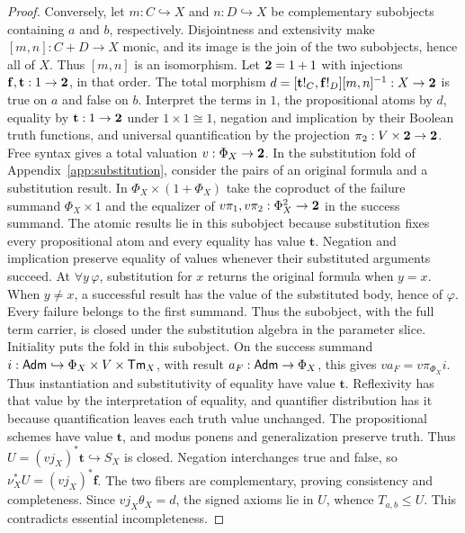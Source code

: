 \begin{proof}
Conversely, let $m:C\hookrightarrow X$ and $n:D\hookrightarrow X$
be complementary subobjects containing $a$ and $b$, respectively.
Disjointness and extensivity make $[m,n]:C+D\to X$ monic, and
its image is the join of the two subobjects, hence all of $X$.
Thus $[m,n]$ is an isomorphism. Let $\mathbf 2=1+1$ with injections
$\mathbf{f},\mathbf{t}:1\to\mathbf 2$, in that order. The total morphism
$d=[\mathbf{t}!_C,\mathbf{f}!_D][m,n]^{-1}:X\to\mathbf 2$
is true on $a$ and false on $b$.
Interpret the terms in $1$, the propositional atoms by $d$, equality
by $\mathbf{t}:1\to\mathbf 2$ under $1\times1\cong1$, negation and
implication by their Boolean truth functions, and universal quantification
by the projection
$\pi_2:V\times\mathbf 2\to\mathbf 2$.
Free syntax gives a total valuation $v:\Phi_X\to\mathbf 2$.
In the substitution fold of Appendix~\ref{app:substitution}, consider
the pairs of an original formula and a substitution result. In
$\Phi_X\times(1+\Phi_X)$ take the coproduct of the failure summand
$\Phi_X\times1$ and the equalizer of $v\pi_1,v\pi_2:\Phi_X^2\to\mathbf 2$
in the success summand.
The atomic results lie in this subobject because substitution fixes every
propositional atom and every equality has value $\mathbf t$. Negation and implication
preserve equality of values whenever their substituted arguments succeed.
At $\forall y\,\varphi$, substitution for $x$ returns the original
formula when $y=x$. When $y\ne x$, a successful result has the value
of the substituted body, hence of $\varphi$. Every failure belongs to
the first summand. Thus the subobject, with the full term carrier, is
closed under the substitution algebra in the parameter slice.
Initiality puts the fold in this subobject. On the success summand
$i:\mathsf{Adm}\hookrightarrow\Phi_X\times V\times\mathsf{Tm}_X$, with result
$a_F:\mathsf{Adm}\to\Phi_X$, this gives $v a_F=v\pi_{\Phi_X}i$.
Thus instantiation and
substitutivity of equality have value
$\mathbf{t}$. Reflexivity has that value by the interpretation of
equality, and quantifier distribution has it because quantification leaves
each truth value unchanged. The propositional schemes have value
$\mathbf{t}$, and modus ponens and generalization preserve truth.
Thus $U=(v j_X)^*\mathbf{t}\hookrightarrow S_X$ is closed. Negation
interchanges true and false, so $\nu_X^*U=(v j_X)^*\mathbf{f}$.
The two fibers are complementary, proving consistency and completeness.
Since $v j_X\theta_X=d$, the signed axioms lie in $U$, whence
$T_{a,b}\leq U$.
This contradicts essential incompleteness.
\end{proof}
